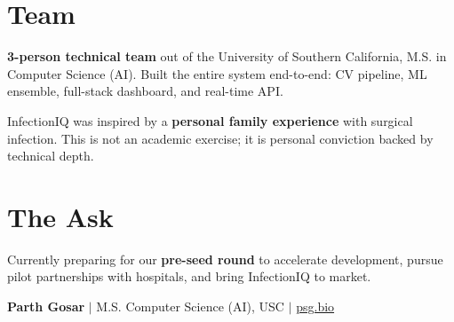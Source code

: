 \documentclass[11pt,a4paper]{article}
\begin{document}
\section{Team}

\textbf{3-person technical team} out of the University of Southern California, M.S. in Computer Science (AI). Built the entire system end-to-end: CV pipeline, ML ensemble, full-stack dashboard, and real-time API.

InfectionIQ was inspired by a \textbf{personal family experience} with surgical infection. This is not an academic exercise; it is personal conviction backed by technical depth.

\section{The Ask}

Currently preparing for our \textbf{pre-seed round} to accelerate development, pursue pilot partnerships with hospitals, and bring InfectionIQ to market.

\vfill

\begin{center}
    \small\color{darkgray}
    \textbf{Parth Gosar} $\mid$ M.S. Computer Science (AI), USC $\mid$ \href{https://psg.bio}{psg.bio}
\end{center}
\end{document}
